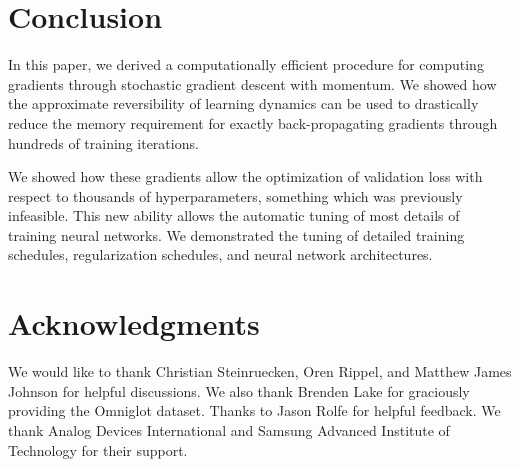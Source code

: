 \documentclass{article}
\begin{document}
\section{Conclusion}

In this paper, we derived a computationally efficient procedure for computing gradients through stochastic gradient descent with momentum.
We showed how the approximate reversibility of learning dynamics can be used to drastically reduce the memory requirement for exactly back-propagating gradients through hundreds of training iterations.

We showed how these gradients allow the optimization of validation loss with respect to thousands of hyperparameters, something which was previously infeasible.
This new ability allows the automatic tuning of most details of training neural networks.
We demonstrated the tuning of detailed training schedules, regularization schedules, and neural network architectures.

\section*{Acknowledgments}
We would like to thank Christian Steinruecken, Oren Rippel, and Matthew James Johnson for helpful discussions.
We also thank Brenden Lake for graciously providing the Omniglot dataset.
Thanks to Jason Rolfe for helpful feedback.
We thank Analog Devices International and Samsung Advanced Institute of Technology for their support.



\end{document}
